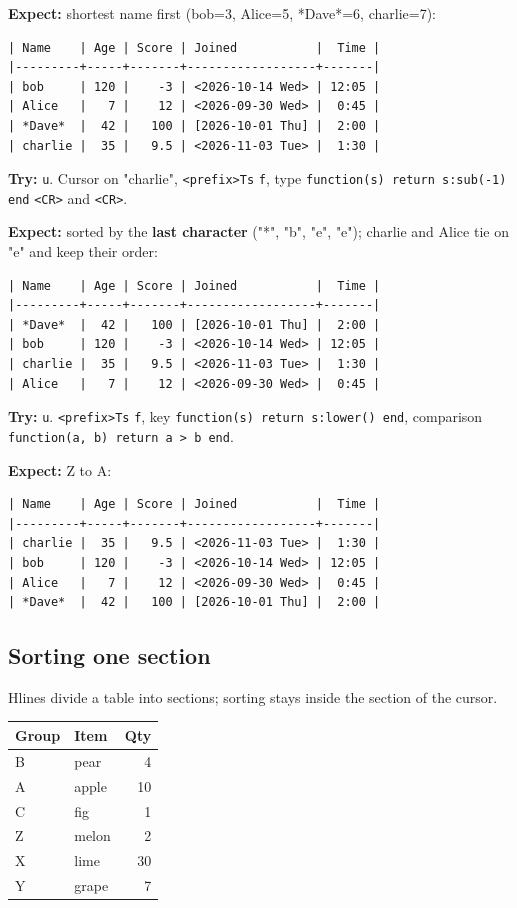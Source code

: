 \textbf{Expect:} shortest name first (bob=3, Alice=5, *Dave*=6, charlie=7):
\begin{verbatim}
| Name    | Age | Score | Joined           |  Time |
|---------+-----+-------+------------------+-------|
| bob     | 120 |    -3 | <2026-10-14 Wed> | 12:05 |
| Alice   |   7 |    12 | <2026-09-30 Wed> |  0:45 |
| *Dave*  |  42 |   100 | [2026-10-01 Thu] |  2:00 |
| charlie |  35 |   9.5 | <2026-11-03 Tue> |  1:30 |
\end{verbatim}

\textbf{Try:} \texttt{u}. Cursor on "charlie", \texttt{<prefix>Ts} \texttt{f}, type
\texttt{function(s) return s:sub(-1) end} \texttt{<CR>} and \texttt{<CR>}.

\textbf{Expect:} sorted by the \textbf{last character} ("*", "b", "e", "e"); charlie and
Alice tie on "e" and keep their order:
\begin{verbatim}
| Name    | Age | Score | Joined           |  Time |
|---------+-----+-------+------------------+-------|
| *Dave*  |  42 |   100 | [2026-10-01 Thu] |  2:00 |
| bob     | 120 |    -3 | <2026-10-14 Wed> | 12:05 |
| charlie |  35 |   9.5 | <2026-11-03 Tue> |  1:30 |
| Alice   |   7 |    12 | <2026-09-30 Wed> |  0:45 |
\end{verbatim}

\textbf{Try:} \texttt{u}. \texttt{<prefix>Ts} \texttt{f}, key \texttt{function(s) return s:lower() end},
comparison \texttt{function(a, b) return a > b end}.

\textbf{Expect:} Z to A:
\begin{verbatim}
| Name    | Age | Score | Joined           |  Time |
|---------+-----+-------+------------------+-------|
| charlie |  35 |   9.5 | <2026-11-03 Tue> |  1:30 |
| bob     | 120 |    -3 | <2026-10-14 Wed> | 12:05 |
| Alice   |   7 |    12 | <2026-09-30 Wed> |  0:45 |
| *Dave*  |  42 |   100 | [2026-10-01 Thu] |  2:00 |
\end{verbatim}
\subsection{Sorting one section}
\label{sec:org32a6c99}
Hlines divide a table into sections; sorting stays inside the section of
the cursor.

\begin{table}[htbp]
\label{tab:org3845ba5}
\centering
\begin{tabular}{llr}
Group & Item & Qty\\
\hline
B & pear & 4\\
A & apple & 10\\
C & fig & 1\\
\hline
Z & melon & 2\\
X & lime & 30\\
Y & grape & 7\\
\end{tabular}
\end{table}


